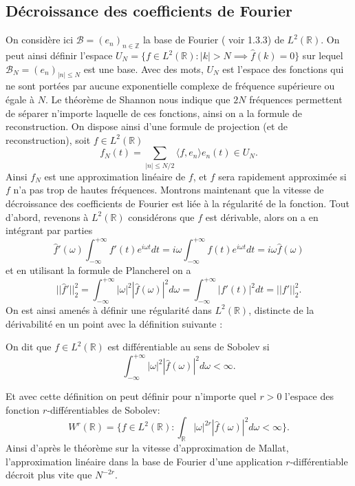 \subsection{Décroissance des coefficients de Fourier}
On considère ici $\mathcal{B} = (e_{n})_{n \in \mathbb{Z}}$ la base de Fourier ( voir 1.3.3) de $L^2(\mathbb{R})$.
On peut ainsi définir l'espace $U_N = \{f \in L^2(\mathbb{R}) : |k| > N \implies \hat{f}(k) = 0\}$ sur lequel $\mathcal{B}_N = (e_{n})_{|n|\leq N}$ est une base. 
Avec des mots, $U_N$ est l'espace des fonctions qui ne sont portées par aucune exponentielle complexe de fréquence supérieure ou égale à $N$.
Le théorème de Shannon nous indique que $2N$ fréquences permettent de séparer n'importe laquelle de ces fonctions, ainsi on  a la formule de reconstruction.
On dispose ainsi d'une formule de projection (et de reconstruction), soit $f \in L^2(\mathbb{R})$
\begin{equation}
	f_N(t) = \sum_{|n|\leq N/2} \langle f, e_n \rangle e_n(t) \in U_N.
\end{equation}
Ainsi $f_N$ est une approximation linéaire de $f$, et $f$ sera rapidement approximée si $f$ n'a pas trop de hautes fréquences. 
Montrons maintenant que la vitesse de décroissance des coefficients de Fourier est liée à la régularité de la fonction.
Tout d'abord, revenons à $L^2(\mathbb{R})$ considérons que $f$ est dérivable, alors on a en intégrant par parties
\begin{equation}
	\hat{f}'(\omega)\int_{-\infty}^{+\infty} f'(t) e^{i \omega t} dt = i \omega \int_{-\infty}^{+\infty} f(t) e^{i\omega t} dt = i \omega \hat{f}(\omega) 
\end{equation}
et en utilisant la formule de Plancherel on a 
\begin{equation}
	||\hat{f}'||_2^2 = \int_{-\infty}^{+\infty} |\omega|^2 |\hat{f}(\omega)|^2 d\omega = \int_{-\infty}^{+\infty} |f'(t)|^2 dt = ||f'||_2^2.
\end{equation}
On est ainsi amenés à définir une régularité dans $L^2(\mathbb{R})$, distincte de la dérivabilité en un point avec la définition suivante :
\begin{definition}
	On dit que $f\in L^2(\mathbb{R})$ est différentiable au sens de Sobolev si
	\begin{equation*}
		\int_{-\infty}^{+\infty} |\omega|^2|\hat{f}(\omega)|^2 d\omega < \infty. 
	\end{equation*}
\end{definition}
Et avec cette définition on peut définir pour n'importe quel $r>0$ l'espace des fonction $r$-différentiables de Sobolev:
\begin{equation}
	W^r(\mathbb{R}) =\{ f \in L^2(\mathbb{R}) : \int_{\mathbb{R}} |\omega|^{2r} |\hat{f}(\omega)|^2 d\omega < \infty \}.
\end{equation}
Ainsi d'après le théorème sur la vitesse d'approximation de Mallat, l'approximation linéaire dans la base de Fourier d'une application $r$-différentiable décroit plus vite que $N^{-2r}$.
